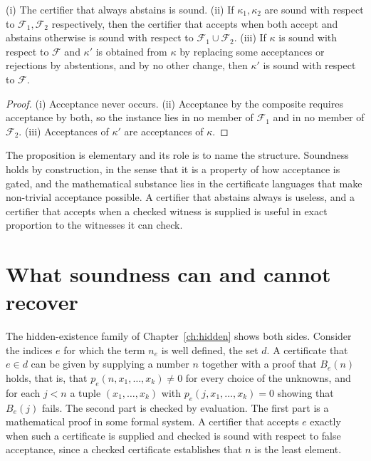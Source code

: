 \begin{proposition}[RV-011]
\label{prop:rv011}
(i) The certifier that always abstains is sound. (ii) If $\kappa_1, \kappa_2$ are sound with respect to $\mathcal{F}_1, \mathcal{F}_2$ respectively, then the certifier that accepts when both accept and abstains otherwise is sound with respect to $\mathcal{F}_1 \cup \mathcal{F}_2$. (iii) If $\kappa$ is sound with respect to $\mathcal{F}$ and $\kappa'$ is obtained from $\kappa$ by replacing some acceptances or rejections by abstentions, and by no other change, then $\kappa'$ is sound with respect to $\mathcal{F}$.
\end{proposition}

\begin{proof}
(i) Acceptance never occurs. (ii) Acceptance by the composite requires acceptance by both, so the instance lies in no member of $\mathcal{F}_1$ and in no member of $\mathcal{F}_2$. (iii) Acceptances of $\kappa'$ are acceptances of $\kappa$.
\end{proof}

The proposition is elementary and its role is to name the structure. Soundness holds by construction, in the sense that it is a property of how acceptance is gated, and the mathematical substance lies in the certificate languages that make non-trivial acceptance possible. A certifier that abstains always is useless, and a certifier that accepts when a checked witness is supplied is useful in exact proportion to the witnesses it can check.

\section{What soundness can and cannot recover}

The hidden-existence family of Chapter~\ref{ch:hidden} shows both sides. Consider the indices $e$ for which the term $n_e$ is well defined, the set $d$. A certificate that $e \in d$ can be given by supplying a number $n$ together with a proof that $B_e(n)$ holds, that is, that $p_e(n, x_1, \dots, x_k) \ne 0$ for every choice of the unknowns, and for each $j < n$ a tuple $(x_1, \dots, x_k)$ with $p_e(j, x_1, \dots, x_k) = 0$ showing that $B_e(j)$ fails. The second part is checked by evaluation. The first part is a mathematical proof in some formal system. A certifier that accepts $e$ exactly when such a certificate is supplied and checked is sound with respect to false acceptance, since a checked certificate establishes that $n$ is the least element.

